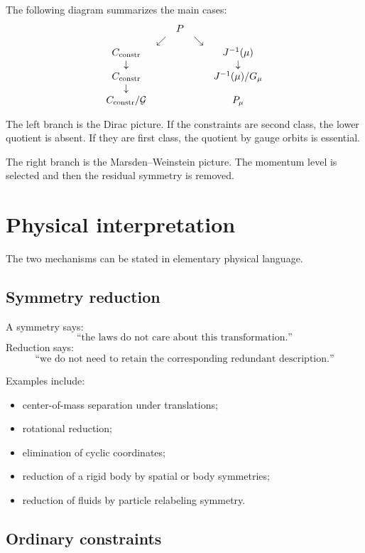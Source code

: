 \documentclass[11pt,a4paper]{article}
\theoremstyle{definition}
\begin{document}
The following diagram summarizes the main cases:
\[
\begin{array}{ccccc}
&& P &&\\
&\swarrow&&\searrow&\\
C_{\rm constr}&&&&J^{-1}(\mu)\\
\downarrow&&&&\downarrow\\
C_{\rm constr}&&&&J^{-1}(\mu)/G_\mu\\
\downarrow&&&&\\
C_{\rm constr}/\mathcal G&&&&P_\mu
\end{array}
\]

The left branch is the Dirac picture.  If the constraints are second class,
the lower quotient is absent.  If they are first class, the quotient by gauge
orbits is essential.

The right branch is the Marsden--Weinstein picture.  The momentum level is
selected and then the residual symmetry is removed.

\section{Physical interpretation}

The two mechanisms can be stated in elementary physical language.

\subsection{Symmetry reduction}

A symmetry says:
\[
        \text{``the laws do not care about this transformation.''}
\]
Reduction says:
\[
        \text{``we do not need to retain the corresponding redundant
        description.''}
\]

Examples include:
\begin{itemize}
\item center-of-mass separation under translations;
\item rotational reduction;
\item elimination of cyclic coordinates;
\item reduction of a rigid body by spatial or body symmetries;
\item reduction of fluids by particle relabeling symmetry.
\end{itemize}

\subsection{Ordinary constraints}
\end{document}
